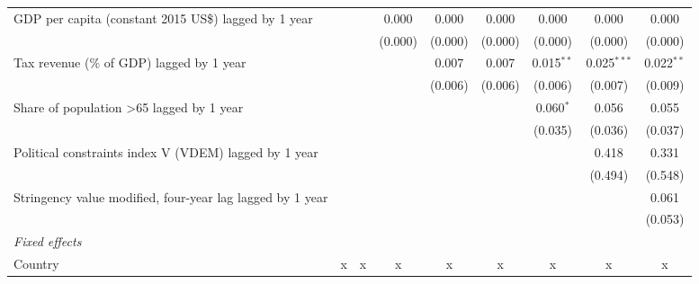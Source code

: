 \begin{tabular}{lcccccccc}
   GDP per capita (constant 2015 US\$) lagged by 1 year                      &               &               & 0.000         & 0.000         & 0.000         & 0.000        & 0.000         & 0.000\\   
                                                                             &               &               & (0.000)       & (0.000)       & (0.000)       & (0.000)      & (0.000)       & (0.000)\\   
   Tax revenue (\% of GDP) lagged by 1 year                                  &               &               &               & 0.007         & 0.007         & 0.015$^{**}$ & 0.025$^{***}$ & 0.022$^{**}$\\   
                                                                             &               &               &               & (0.006)       & (0.006)       & (0.006)      & (0.007)       & (0.009)\\   
   Share of population >65 lagged by 1 year                                  &               &               &               &               &               & 0.060$^{*}$  & 0.056         & 0.055\\   
                                                                             &               &               &               &               &               & (0.035)      & (0.036)       & (0.037)\\   
   Political constraints index V (VDEM) lagged by 1 year                     &               &               &               &               &               &              & 0.418         & 0.331\\   
                                                                             &               &               &               &               &               &              & (0.494)       & (0.548)\\   
   Stringency value modified, four-year lag lagged by 1 year                 &               &               &               &               &               &              &               & 0.061\\   
                                                                             &               &               &               &               &               &              &               & (0.053)\\   
   \emph{Fixed effects}\\
   Country                                                                   & x             & x             & x             & x             & x             & x            & x             & x\\  

\end{tabular}
